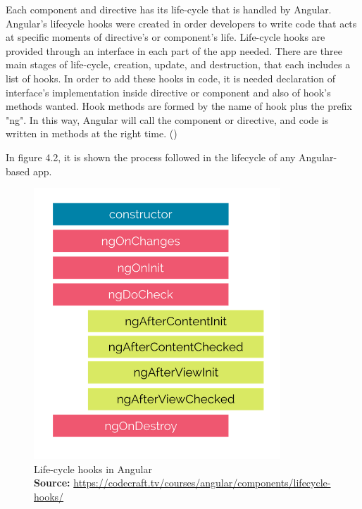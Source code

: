 Each component and directive has its life-cycle that is handled by Angular. Angular's lifecycle hooks were created in order developers to write code that acts at specific moments of directive's or component's life. Life-cycle hooks are provided through an interface in each part of the app needed. There are three main stages of life-cycle, creation, update, and destruction, that each includes a list of hooks. In order to add these hooks in code, it is needed declaration of interface's implementation inside directive or component and also of hook's methods wanted. Hook methods are formed by the name of hook plus the prefix "ng". In this way, Angular will call the component or directive, and code is written in methods at the right time. (\cite{murray2018ng}) \par

In figure 4.2, it is shown the process followed in the lifecycle of any Angular-based app.

\begin{figure}[h!]
	\begin{center}
		\includegraphics[scale=0.65]{images/Lifecycle-hooks_Angular.png}
	\end{center}
	\caption{
		Life-cycle hooks in Angular
		\\
		\textbf{Source:} \url{https://codecraft.tv/courses/angular/components/lifecycle-hooks/}
	}
\end{figure}

